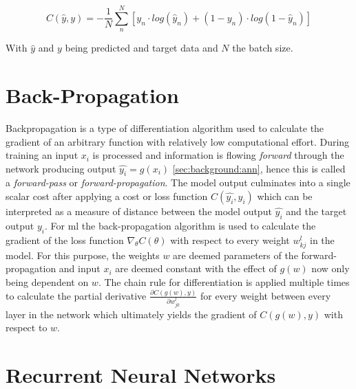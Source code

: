 \begin{equation}
C(\hat{y},y) = -\frac{1}{N}\sum_n^{N}[y_n \cdot log(\hat{y}_n) + (1-y_n) \cdot log(1-\hat{y}_n)]
\end{equation}

With $\hat{y}$ and $y$ being predicted and target data and $N$ the batch size.

\section{Back-Propagation} \label{sec:background:backprop}

Backpropagation is a type of differentiation algorithm used to calculate the gradient of an arbitrary function with relatively low computational effort. During training an input $x_i$
is processed and information is flowing \textit{forward} through the network producing output $\hat{y_i} = g(x_i)$ \ref{sec:background:ann}, hence this is called a \textit{forward-pass} or \textit{forward-propagation}. The model output culminates into a single scalar cost after applying a cost or loss function $C(\hat{y_i}, y_i)$ which can be interpreted as a measure of distance between the model output $\hat{y_i}$ and the target output $y_i$. For \gls{ml} the back-propagation algorithm is used to calculate the gradient of the loss function $\nabla_\theta C(\theta)$ with respect to every weight $w^l_{kj}$ in the model. For this purpose, the weights $w$ are deemed parameters of the forward-propagation and input $x_i$ are deemed constant with the effect of $g(w)$ now only being dependent on $w$. The 
chain rule for differentiation is applied multiple times to calculate the partial derivative $\frac{\partial C(g(w),y)}{\partial w^l_{jk}}$ for every weight between every layer in the network which ultimately yields the gradient of $C(g(w),y)$ with respect to $w$.

\section{Recurrent Neural Networks} \label{sec:background:rnn}

